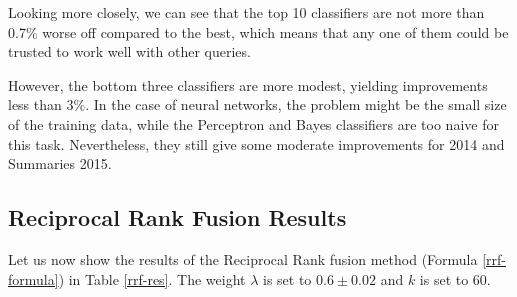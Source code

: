 Looking more closely, we can see that the top 10 classifiers are not more than 0.7\% worse off compared to the best,
which means that any one of them could be trusted to work well with other queries.

However, the bottom three classifiers are more modest, yielding improvements less than 3\%.
In the case of neural networks, the problem might be the small size of the training data,
while the Perceptron and Bayes classifiers are too naive for this task.
Nevertheless, they still give some moderate improvements for 2014 and Summaries 2015.

\subsection{Reciprocal Rank Fusion Results}
Let us now show the results of the Reciprocal Rank fusion method (Formula \ref{rrf-formula}) in Table \ref{rrf-res}.
The weight $\lambda$ is set to $0.6\pm 0.02$ and $k$ is set to 60.

